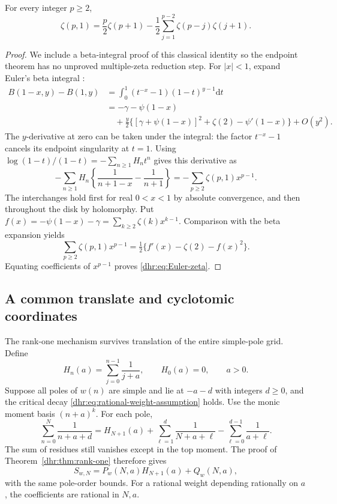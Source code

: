 \begin{lemma}\label{dhr:lem:Euler}
For every integer $p\geq2$,
\begin{equation}\label{dhr:eq:Euler-zeta}
 \zeta(p,1)=\frac p2\zeta(p+1)
 -\frac12\sum_{j=1}^{p-2}\zeta(p-j)\zeta(j+1).
\end{equation}
\end{lemma}
\begin{proof}
We include a beta-integral proof of this classical identity so the
endpoint theorem has no unproved multiple-zeta reduction step.
For $|x|<1$, expand Euler's beta integral \cite{dlmf:beta}:
\begin{align*}
 B(1-x,y)-B(1,y)
 &=\int_0^1(t^{-x}-1)(1-t)^{y-1}\mathrm dt\\
 &=-\gamma-\psi(1-x)\\
 &\quad+\frac y2\big\{[\gamma+\psi(1-x)]^2
                          +\zeta(2)-\psi'(1-x)\big\}+O(y^2).
\end{align*}
The $y$-derivative at zero can be taken under the integral: the
factor $t^{-x}-1$ cancels its endpoint singularity at $t=1$.
Using $\log(1-t)/(1-t)=-\sum_{n\geq1}H_nt^n$ gives this derivative
as
\[
 -\sum_{n\geq1}H_n\left\{\frac1{n+1-x}-\frac1{n+1}\right\}
 =-\sum_{p\geq2}\zeta(p,1)x^{p-1}.
\]
The interchanges hold first for real $0<x<1$ by absolute convergence,
and then throughout the disk by holomorphy. Put
$f(x)=-\psi(1-x)-\gamma=\sum_{k\geq2}\zeta(k)x^{k-1}$.
Comparison with the beta expansion yields
\[
 \sum_{p\geq2}\zeta(p,1)x^{p-1}
 =\tfrac12\{f'(x)-\zeta(2)-f(x)^2\}.
\]
Equating coefficients of $x^{p-1}$ proves
\eqref{dhr:eq:Euler-zeta}.
\end{proof}

\subsection{A common translate and cyclotomic coordinates}
The rank-one mechanism survives translation of the entire simple-pole
grid. Define
\[
 H_n(a)=\sum_{j=0}^{n-1}\frac1{j+a},\qquad H_0(a)=0,\qquad a>0.
\]
Suppose all poles of $w(n)$ are simple and lie at $-a-d$ with
integers $d\geq0$, and the critical decay
\eqref{dhr:eq:rational-weight-assumption} holds. Use the monic moment
basis $(n+a)^k$. For each pole,
\[
 \sum_{n=0}^N\frac1{n+a+d}
 =H_{N+1}(a)+\sum_{\ell=1}^d\frac1{N+a+\ell}
                 -\sum_{\ell=0}^{d-1}\frac1{a+\ell}.
\]
The sum of residues still vanishes except in the top moment.
The proof of Theorem~\ref{dhr:thm:rank-one} therefore gives
\begin{equation}\label{dhr:eq:translated-cutoff}
 S_{w,N}=P_w(N,a)H_{N+1}(a)+Q_w(N,a),
\end{equation}
with the same pole-order bounds. For a rational weight depending
rationally on $a$, the coefficients are rational in $N,a$.

